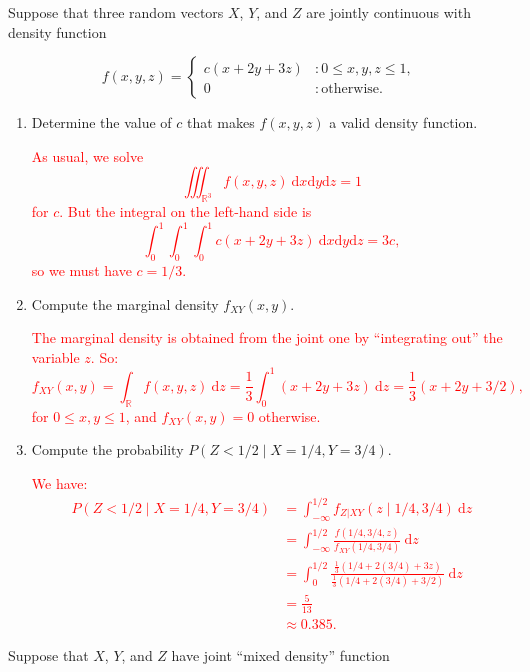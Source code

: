 \documentclass[12pt,reqno]{amsart}
\begin{document}
\bigskip
\prob Suppose that three random vectors $X$, $Y$, and $Z$ are jointly continuous with density function

	\[f(x,y,z) = \begin{cases}
	c(x+2y+3z) & : 0\leq x, y, z \leq 1, \\
	0 & : \text{otherwise}.
	\end{cases}
	\]

\medskip
\begin{enumerate}
\item Determine the value of $c$ that makes $f(x,y,z)$ a valid density function.

\bigskip
\textcolor{red}{As usual, we solve
	\[\iiint_{\mathbb{R}^3} f(x,y,z) \ \text{d}x\text{d}y\text{d}z = 1
	\]
for $c$. But the integral on the left-hand side is
	\[\int_0^1 \int_0^1 \int_0^1 c (x+2y+3z)\ \text{d}x\text{d}y\text{d}z = 3c,
	\]
so we must have $c = 1/3$.}
\bigskip

\item Compute the marginal density $f_{XY}(x,y)$.

\bigskip
\textcolor{red}{The marginal density is obtained from the joint one by ``integrating out'' the variable $z$. So:
	\[f_{XY}(x,y) = \int_{\mathbb{R}} f(x,y,z) \ \text{d} z = \frac{1}{3} \int_0^1(x+2y+3z) \ \text{d} z = \frac{1}{3}\left( x+2y + 3/2 \right),
	\]
for $0\leq x, y \leq 1$, and $f_{XY}(x,y)=0$ otherwise.}
\bigskip

\item Compute the probability $P\left( Z < 1/2 \mid X = 1/4,  Y = 3/4 \right)$.

\bigskip
\textcolor{red}{We have:
	\begin{align*}
	P\left( Z < 1/2 \mid X = 1/4,  Y = 3/4 \right) &= \int_{-\infty}^{1/2} f_{Z|XY}(z \mid 1/4,3/4) \ \text{d}z \\
	&= \int_{-\infty}^{1/2} \frac{f(1/4,3/4,z)}{f_{XY}(1/4,3/4)} \ \text{d} z \\
	&= \int_0^{1/2} \frac{\frac{1}{3} (1/4+2(3/4)+3z)}{\frac{1}{3}(1/4 + 2(3/4) + 3/2)} \ \text{d} z \\
	&= \frac{5}{13} \\
	&\approx 0.385.
	\end{align*}}
\end{enumerate}









\bigskip
\prob Suppose that $X$, $Y$, and $Z$ have joint ``mixed density'' function
\end{document}
